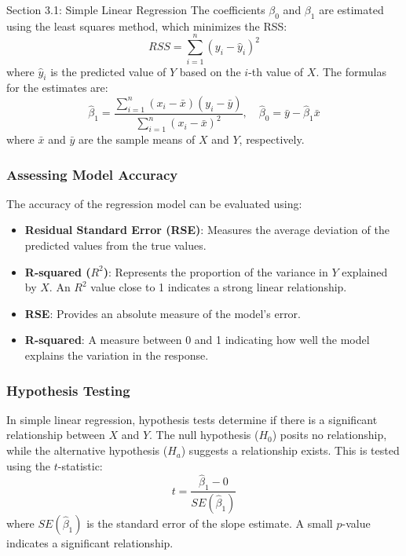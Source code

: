 \begin{notes}{Section 3.1: Simple Linear Regression}
    The coefficients $\beta_0$ and $\beta_1$ are estimated using the least squares method, which minimizes the RSS:
    \[
    RSS = \sum_{i=1}^n (y_i - \hat{y}_i)^2
    \]
    where $\hat{y}_i$ is the predicted value of $Y$ based on the $i$-th value of $X$. The formulas for the estimates are:
    \[
    \hat{\beta}_1 = \frac{\sum_{i=1}^n (x_i - \bar{x})(y_i - \bar{y})}{\sum_{i=1}^n (x_i - \bar{x})^2}, \quad \hat{\beta}_0 = \bar{y} - \hat{\beta}_1 \bar{x}
    \]
    where $\bar{x}$ and $\bar{y}$ are the sample means of $X$ and $Y$, respectively.
    
    \subsubsection*{Assessing Model Accuracy}
    
    The accuracy of the regression model can be evaluated using:
    \begin{itemize}
        \item \textbf{Residual Standard Error (RSE)}: Measures the average deviation of the predicted values from the true values.
        \item \textbf{R-squared ($R^2$)}: Represents the proportion of the variance in $Y$ explained by $X$. An $R^2$ value close to 1 indicates a strong linear relationship.
    \end{itemize}
    
    \begin{highlight}
        \begin{itemize}
            \item \textbf{RSE}: Provides an absolute measure of the model's error.
            \item \textbf{R-squared}: A measure between 0 and 1 indicating how well the model explains the variation in the response.
        \end{itemize}
    \end{highlight}
    
    \subsubsection*{Hypothesis Testing}
    
    In simple linear regression, hypothesis tests determine if there is a significant relationship between $X$ and $Y$. The null hypothesis ($H_0$) posits no relationship, while the alternative 
    hypothesis ($H_a$) suggests a relationship exists. This is tested using the $t$-statistic:
    \[
    t = \frac{\hat{\beta}_1 - 0}{SE(\hat{\beta}_1)}
    \]
    where $SE(\hat{\beta}_1)$ is the standard error of the slope estimate. A small $p$-value indicates a significant relationship.
    

\end{notes}

